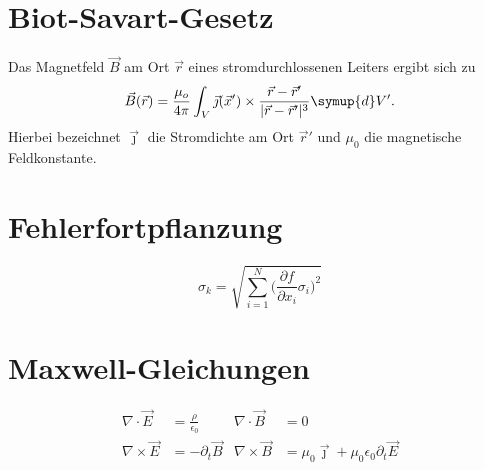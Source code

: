 \documentclass{scrartcl}
\newcommand{\be}{\begin{equation}} %
\newcommand{\ee}{\end{equation}} %
\begin{document}
\section{Biot-Savart-Gesetz}
Das Magnetfeld $\vec{B}$ am Ort $\vec{r}$
eines stromdurchlossenen Leiters ergibt sich zu
 \be
    \vec{B}
    (\vec{r})
    =
    \frac{\mu_o}{4\pi}
    \int_V
    \vec{\jmath}
    (\vec{x}')
    \times \frac{\vec{r}-\vec{r}'}
    {\lvert\vec{r}-\vec{r}'\rvert^3} \symup{d}V'. %
      \ee
  Hierbei bezeichnet $\vec{\jmath}$ die Stromdichte am Ort $\vec{r}'$
  und ${\mu_0}$ die magnetische Feldkonstante.

  \section{Fehlerfortpflanzung}
  \begin{equation}
    \sigma_k =
    \sqrt{\sum_{i=1}^N
    \Biggl(\frac{\partial f}{\partial{x_i}} \sigma_i \Biggr)^2}
  \end{equation}
  \section{Maxwell-Gleichungen}
  \begin{align}
    \nabla\cdot\vec{E} &= \frac{\rho}{\epsilon_0}  &  \nabla\cdot\vec{B} &= 0 \\
    \nabla\times\vec{E} &= -\partial_t\vec{B} & \nabla\times\vec{B} &= \mu_0\vec{\jmath}
    +\mu_0\epsilon_0\partial_t\vec{E}
\end{align}
\end{document}
